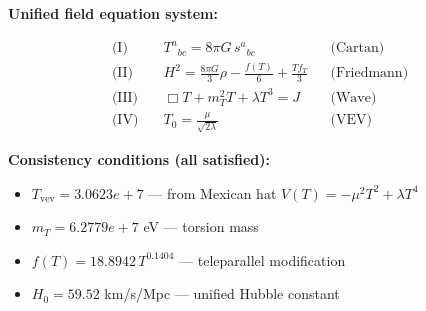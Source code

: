 
\textbf{Unified field equation system:}

\begin{align}
  \text{(I)} \quad & T^a{}_{bc} = 8\pi G \, s^a{}_{bc} && \text{(Cartan)} \\
  \text{(II)} \quad & H^2 = \frac{8\pi G}{3}\rho - \frac{f(T)}{6} + \frac{Tf_T}{3} && \text{(Friedmann)} \\
  \text{(III)} \quad & \Box T + m_T^2 T + \lambda T^3 = J && \text{(Wave)} \\
  \text{(IV)} \quad & T_0 = \frac{\mu}{\sqrt{2\lambda}} && \text{(VEV)}
\end{align}

\textbf{Consistency conditions (all satisfied):}
\begin{itemize}
  \item $T_{\text{vev}} = 3.0623e+7$ — from Mexican hat $V(T) = -\mu^2 T^2 + \lambda T^4$
  \item $m_T = 6.2779e+7$ eV — torsion mass
  \item $f(T) = 18.8942 \, T^{0.1404}$ — teleparallel modification
  \item $H_0 = 59.52$ km/s/Mpc — unified Hubble constant
\end{itemize}